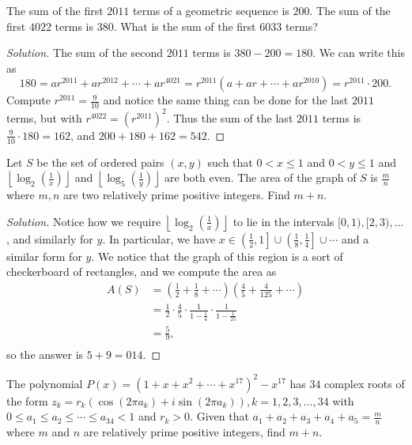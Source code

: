 \begin{prb}[2011 AIME II-5]
The sum of the first $2011$ terms of a geometric sequence is $200$. The sum of
the first $4022$ terms is $380$. What is the sum of the first $6033$ terms?
\end{prb}

\ifsolutions
\begin{proof}[Solution]
The sum of the second $2011$ terms is $380 - 200 = 180$. We can write this as
\[ 180 = ar^{2011} + ar^{2012} + \cdots + ar^{4021} = r^{2011} (a + ar + \cdots
+ ar^{2010}) = r^{2011} \cdot 200 . \]
Compute $r^{2011} = \frac{9}{10}$ and notice the same thing can be done for the
last $2011$ terms, but with $r^{4022} = (r^{2011})^2$. Thus the sum of the last
$2011$ terms is $\frac{9}{10} \cdot 180 = 162$, and $200 + 180 + 162 =
\boxed{542}$.
\end{proof}
\fi

\begin{prb}[2004 AIME I-12]
Let $S$ be the set of ordered pairs $(x, y)$ such that $0 < x \leq 1$ and $0 < y
\leq 1$ and $\left\lfloor \log_2 \left( \frac{1}{x} \right) \right\rfloor$ and
$\left\lfloor \log_5 \left( \frac{1}{y} \right) \right\rfloor$ are both even.
The area of the graph of $S$ is $\frac{m}{n}$ where $m, n$ are two relatively
prime positive integers. Find $m + n$.
\end{prb}

\ifsolutions
\begin{proof}[Solution]
Notice how we require $\left\lfloor \log_2 \left( \frac{1}{x} \right)
\right\rfloor$ to lie in the intervals $[0, 1), [2, 3), \dots$, and similarly
for $y$. In particular, we have $x \in \left( \frac{1}{2}, 1 \right] \cup \left(
\frac{1}{8}, \frac{1}{4} \right] \cup \cdots$ and a similar form for $y$. We
notice that the graph of this region is a sort of checkerboard of rectangles,
and we compute the area as
\[ \begin{aligned}
A(S) &= \left( \frac{1}{2} + \frac{1}{8} + \cdots \right) \left( \frac{4}{5} +
\frac{4}{125} + \cdots \right) \\
&= \frac{1}{2} \cdot \frac{4}{5} \cdot \frac{1}{1 - \frac{1}{4}} \cdot
\frac{1}{1 - \frac{1}{25}} \\
&= \frac{5}{9}, \\
\end{aligned} \]
so the answer is $5 + 9 = \boxed{014}$.
\end{proof}
\fi

\begin{prb}[2004 AIME I-13]
The polynomial $P(x) = (1 + x + x^2 + \cdots + x^{17})^2 - x^{17}$ has $34$
complex roots of the form $z_k = r_k \left( \cos (2 \pi a_k) + i \sin (2 \pi
a_k) \right), k = 1, 2, 3, \dots, 34$ with $0 \leq a_1 \leq a_2 \leq \cdots \leq
a_{34} < 1$ and $r_k > 0$. Given that $a_1 + a_2 + a_3 + a_4 + a_5 =
\frac{m}{n}$ where $m$ and $n$ are relatively prime positive integers, find $m +
n$.
\end{prb}


